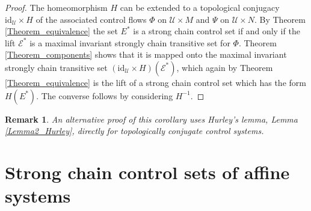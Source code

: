 \documentclass[preprint,12pt]{elsarticle}
\newtheorem{remark}{Remark}
\begin{document}
\begin{proof}
The homeomorphism $H$ can be extended to a topological conjugacy
$\mathrm{id}_{\mathcal{U}}\times H$ of the associated control flows $\Phi$ on
$\mathcal{U}\times M$ and $\Psi$ on $\mathcal{U}\times N$. By Theorem
\ref{Theorem_equivalence} the set $E^{\ast}$ is a strong chain control set if
and only if the lift $\mathcal{E}^{\ast}$ is a maximal invariant strongly
chain transitive set for $\Phi$. Theorem \ref{Theorem_components} shows that
it is mapped onto the maximal invariant strongly chain transitive set $\left(
\mathrm{id}_{\mathcal{U}}\times H\right)  (\mathcal{E}^{\ast})$, which again
by Theorem \ref{Theorem_equivalence} is the lift of a strong chain control set
which has the form $H(E^{\ast})$. The converse follows by considering $H^{-1}$.
\end{proof}

\begin{remark}
An alternative proof of this corollary uses Hurley's lemma, Lemma
\ref{Lemma2_Hurley}, directly for topologically conjugate control systems.
\end{remark}

\section{Strong chain control sets of affine systems\label{Section4}}
\end{document}
